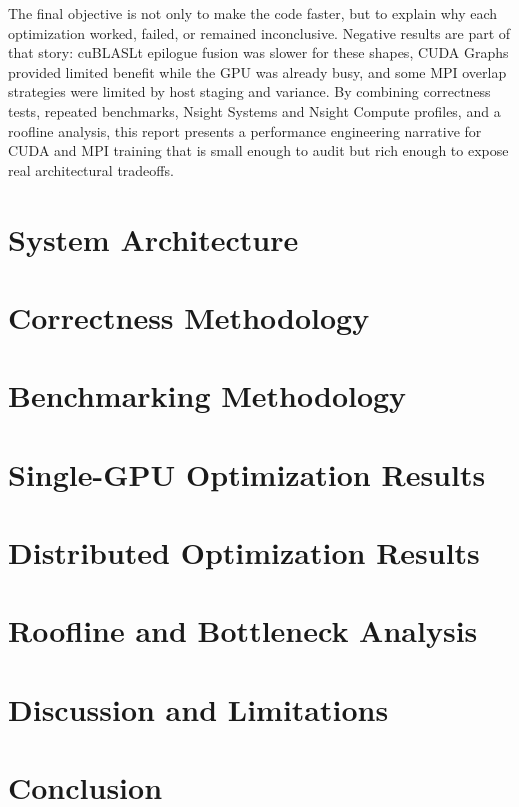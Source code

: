 \documentclass[10pt]{article}
\begin{document}
The final objective is not only to make the code faster, but to explain why
each optimization worked, failed, or remained inconclusive.  Negative results
are part of that story: cuBLASLt epilogue fusion was slower for these shapes,
CUDA Graphs provided limited benefit while the GPU was already busy, and some
MPI overlap strategies were limited by host staging and variance.  By combining
correctness tests, repeated benchmarks, Nsight Systems and Nsight Compute
profiles, and a roofline analysis, this report presents a performance
engineering narrative for CUDA and MPI training that is small enough to audit
but rich enough to expose real architectural tradeoffs.

\section{System Architecture}

\section{Correctness Methodology}

\section{Benchmarking Methodology}

\section{Single-GPU Optimization Results}

\section{Distributed Optimization Results}

\section{Roofline and Bottleneck Analysis}

\section{Discussion and Limitations}

\section{Conclusion}
\end{document}
